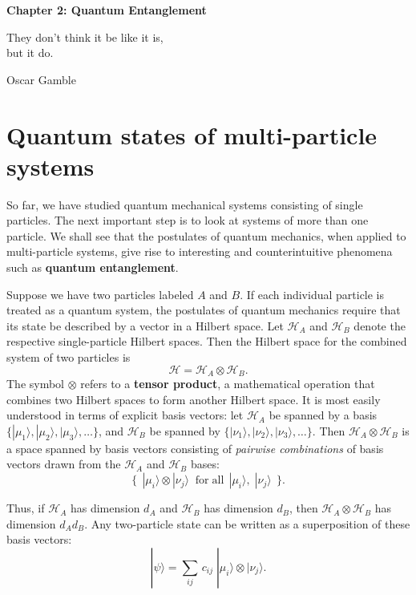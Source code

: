 \documentclass[pra,12pt]{revtex4}
\begin{document}
\begin{center}
{\Large \textbf{Chapter 2: Quantum Entanglement}}
\end{center}

\epigraph{They don't think it be like it is, \\but it do.}{Oscar Gamble}

\section{Quantum states of multi-particle systems}
\label{sec:tensorprod}

So far, we have studied quantum mechanical systems consisting of
single particles.  The next important step is to look at systems of
more than one particle.  We shall see that the postulates of quantum
mechanics, when applied to multi-particle systems, give rise to
interesting and counterintuitive phenomena such as \textbf{quantum
  entanglement}.

Suppose we have two particles labeled $A$ and $B$.  If each individual
particle is treated as a quantum system, the postulates of quantum
mechanics require that its state be described by a vector in a Hilbert
space.  Let $\mathscr{H}_A$ and $\mathscr{H}_B$ denote the respective
single-particle Hilbert spaces.  Then the Hilbert space for the
combined system of two particles is
\begin{equation}
  \mathscr{H} = \mathscr{H}_A\otimes \mathscr{H}_B.
\end{equation}
The symbol $\otimes$ refers to a \textbf{tensor product}, a
mathematical operation that combines two Hilbert spaces to form
another Hilbert space.  It is most easily understood in terms of
explicit basis vectors: let $\mathscr{H}_A$ be spanned by a basis
$\{|\mu_1\rangle, |\mu_2\rangle, |\mu_3\rangle, \dots\}$, and
$\mathscr{H}_B$ be spanned by $\{|\nu_1\rangle, |\nu_2\rangle,
|\nu_3\rangle, \dots\}$.  Then $\mathscr{H}_A \otimes \mathscr{H}_B$
is a space spanned by basis vectors consisting of \textit{pairwise
  combinations} of basis vectors drawn from the $\mathscr{H}_A$ and
$\mathscr{H}_B$ bases:
\begin{equation}
  \Big\{\;\,|\mu_i\rangle\otimes|\nu_j\rangle \;\;  \textrm{for} \; \textrm{all}\;\,|\mu_i\rangle,\; |\nu_j\rangle \;\,\Big\}.
\end{equation}

Thus, if $\mathscr{H}_A$ has dimension $d_A$ and $\mathscr{H}_B$ has
dimension $d_B$, then $\mathscr{H}_A\otimes \mathscr{H}_B$ has
dimension $d_A d_B$.  Any two-particle state can be written as a
superposition of these basis vectors:
\begin{equation}
  |\psi\rangle = \sum_{ij} \, c_{ij}\; |\mu_i\rangle \otimes |\nu_j\rangle.
\end{equation}
\end{document}
